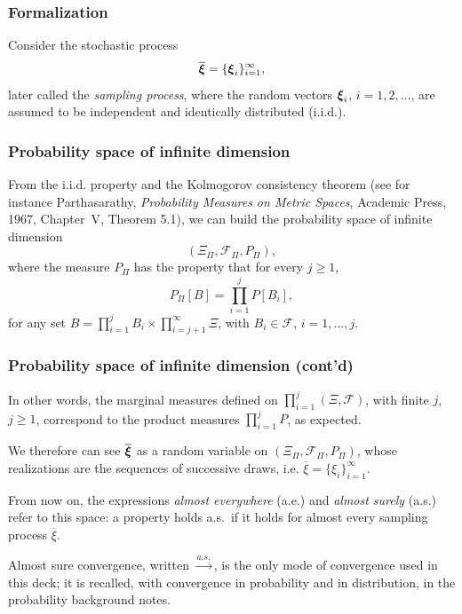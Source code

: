 \documentclass[aspectratio=169]{beamer}
\begin{document}
\begin{frame}
\frametitle{Formalization}



Consider the stochastic process
\[
\overline{{\boldsymbol{\xi}}} = \lbrace {\boldsymbol{\xi}}_i \rbrace_{i = 1}^{\infty},
\]
later called the {\it sampling process}, where the random vectors ${\boldsymbol{\xi}}_i$, $i = 1,2,\ldots$, are assumed to be independent and identically distributed (i.i.d.).

\end{frame}

\begin{frame}
\frametitle{Probability space of infinite dimension}

From the i.i.d. property and the Kolmogorov consistency theorem (see for instance Parthasarathy, {\sl Probability Measures on Metric   Spaces}, Academic Press, 1967, Chapter~V, Theorem 5.1), we can build the probability space of infinite dimension
\[
\left( \Xi_{\Pi}, \mathcal{F}_{\Pi}, P_{\Pi} \right),
\]
where the measure $P_{\Pi}$ has the property that for every $j \geq 1$,
\[
P_{\Pi}[B] = \prod_{i = 1}^j P[B_i],
\]
for any set $B = \prod_{i=1}^j B_i \times \prod_{i=j+1}^{\infty} \Xi$, with $B_i \in \mathcal{F}$, $i =
1,\ldots,j$.

\end{frame}

\begin{frame}
\frametitle{Probability space of infinite dimension (cont'd)}

In other words, the marginal measures defined on $\prod_{i = 1}^j (\Xi, \mathcal{F})$, with finite $j$, $j \geq 1$, correspond to the product measures $\prod_{i = 1}^j P$, as expected.

\mbox{}

We therefore can see $\overline{{\boldsymbol{\xi}}}$ as a random variable on $\left( \Xi_{\Pi}, \mathcal{F}_{\Pi}, P_{\Pi} \right)$, whose realizations are the sequences of successive draws, i.e. 
$\overline{\xi} = \lbrace \xi_i \rbrace_{i = 1}^{\infty}$.

\mbox{}

From now on, the expressions \textsl{\blue almost everywhere} (a.e.) and \textsl{\blue almost surely} (a.s.) refer to this space: a property holds a.s.\ if it holds for almost every sampling process $\overline{\xi}$.

\mbox{}

{\blue Almost sure convergence}, written $\overset{a.s.}{\longrightarrow}$, is the only mode of convergence used in this deck; it is recalled, with convergence in probability and in distribution, in the {\red probability background notes}.

\end{frame}
\end{document}
